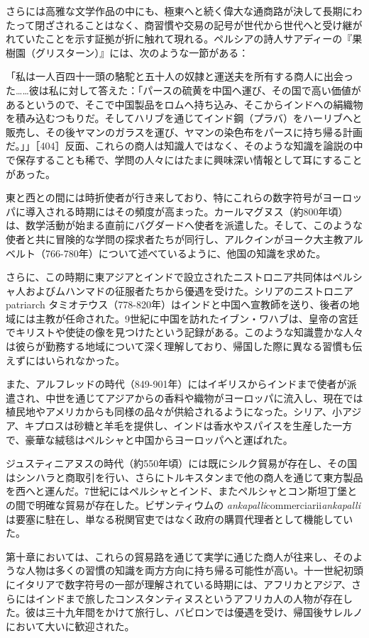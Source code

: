 \documentclass[a4paper,11pt,openany]{ltjsbook}
\begin{document}
さらには高雅な文学作品の中にも、極東へと続く偉大な通商路が決して長期にわたって閉ざされることはなく、商習慣や交易の記号が世代から世代へと受け継がれていたことを示す証拠が折に触れて現れる。ペルシアの詩人サアディーの『果樹園（グリスターン）』には、次のような一節がある：

「私は一人百四十一頭の駱駝と五十人の奴隷と運送夫を所有する商人に出会った……彼は私に対して答えた：「パースの硫黄を中国へ運び、その国で高い価値があるというので、そこで中国製品をロムへ持ち込み、そこからインドへの絹織物を積み込むつもりだ。そしてハリブを通じてインド鋼（プラバ）をハーリブへと販売し、その後ヤマンのガラスを運び、ヤマンの染色布をパースに持ち帰る計画だ。」」［404］反面、これらの商人は知識人ではなく、そのような知識を論説の中で保存することも稀で、学問の人々にはたまに興味深い情報として耳にすることがあった。

東と西との間には時折使者が行き来しており、特にこれらの数字符号がヨーロッパに導入される時期にはその頻度が高まった。カールマグヌス（約800年頃）は、数学活動が始まる直前にバグダードへ使者を派遣した。そして、このような使者と共に冒険的な学問の探求者たちが同行し、アルクインがヨーク大主教アルベルト（766-780年）について述べているように、他国の知識を求めた。

さらに、この時期に東アジアとインドで設立されたニストロニア共同体はペルシャ人およびムハンマドの征服者たちから優遇を受けた。シリアのニストロニア patriarch タミオテウス（778-820年）はインドと中国へ宣教師を送り、後者の地域には主教が任命された。9世紀に中国を訪れたイブン・ワハブは、皇帝の宮廷でキリストや使徒の像を見つけたという記録がある。このような知識豊かな人々は彼らが勤務する地域について深く理解しており、帰国した際に異なる習慣も伝えずにはいられなかった。

また、アルフレッドの時代（849-901年）にはイギリスからインドまで使者が派遣され、中世を通じてアジアからの香料や織物がヨーロッパに流入し、現在では植民地やアメリカからも同様の品々が供給されるようになった。シリア、小アジア、キプロスは砂糖と羊毛を提供し、インドは香水やスパイスを生産した一方で、豪華な絨毯はペルシャと中国からヨーロッパへと運ばれた。

ジュスティニアヌスの時代（約550年頃）には既にシルク貿易が存在し、その国はシンハラと商取引を行い、さらにトルキスタンまで他の商人を通じて東方製品を西へと運んだ。7世紀にはペルシャとインド、またペルシャとコン斯坦丁堡との間で明確な貿易が存在した。ビザンティウムの \textit{ankapalli}commerciarii\textit{ankapalli} は要塞に駐在し、単なる税関官吏ではなく政府の購買代理者として機能していた。

第十章においては、これらの貿易路を通じて実学に通じた商人が往来し、そのような人物は多くの習慣の知識を両方方向に持ち帰る可能性が高い。十一世紀初頭にイタリアで数字符号の一部が理解されている時期には、アフリカとアジア、さらにはインドまで旅したコンスタンティヌスというアフリカ人の人物が存在した。彼は三十九年間をかけて旅行し、バビロンでは優遇を受け、帰国後サレルノにおいて大いに歓迎された。
\end{document}
